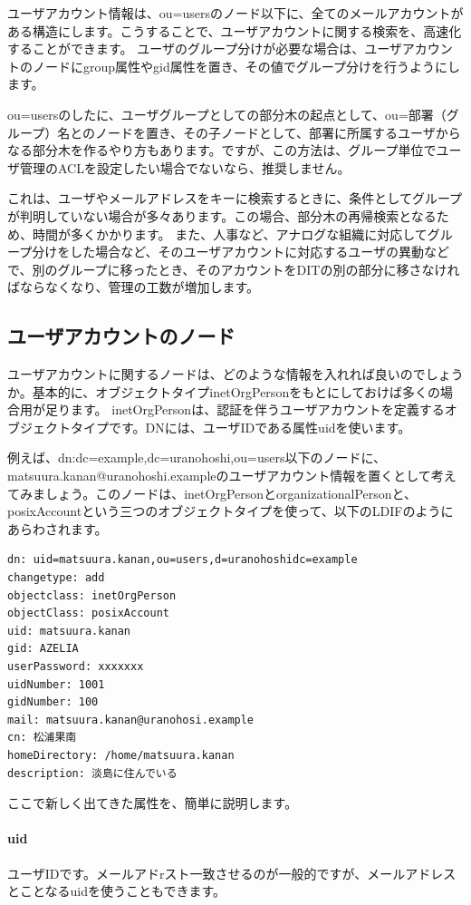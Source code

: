 ユーザアカウント情報は、ou=usersのノード以下に、全てのメールアカウントがある構造にします。こうすることで、ユーザアカウントに関する検索を、高速化することができます。
ユーザのグループ分けが必要な場合は、ユーザアカウントのノードにgroup属性やgid属性を置き、その値でグループ分けを行うようにします。

ou=usersのしたに、ユーザグループとしての部分木の起点として、ou=部署（グループ）名とのノードを置き、その子ノードとして、部署に所属するユーザからなる部分木を作るやり方もあります。ですが、この方法は、グループ単位でユーザ管理のACLを設定したい場合でないなら、推奨しません。

これは、ユーザやメールアドレスをキーに検索するときに、条件としてグループが判明していない場合が多々あります。この場合、部分木の再帰検索となるため、時間が多くかかります。
また、人事など、アナログな組織に対応してグループ分けをした場合など、そのユーザアカウントに対応するユーザの異動などで、別のグループに移ったとき、そのアカウントをDITの別の部分に移さなければならなくなり、管理の工数が増加します。

\subsection{ユーザアカウントのノード}

ユーザアカウントに関するノードは、どのような情報を入れれば良いのでしょうか。基本的に、オブジェクトタイプinetOrgPersonをもとにしておけば多くの場合用が足ります。
inetOrgPersonは、認証を伴うユーザアカウントを定義するオブジェクトタイプです。DNには、ユーザIDである属性uidを使います。

例えば、dn:dc=example,dc=uranohoshi,ou=users以下のノードに、matsuura.kanan@uranohoshi.exampleのユーザアカウント情報を置くとして考えてみましょう。このノードは、inetOrgPersonとorganizationalPersonと、posixAccountという三つのオブジェクトタイプを使って、以下のLDIFのようにあらわされます。

\begin{verbatim}
dn: uid=matsuura.kanan,ou=users,d=uranohoshidc=example
changetype: add
objectclass: inetOrgPerson
objectClass: posixAccount
uid: matsuura.kanan
gid: AZELIA
userPassword: xxxxxxx
uidNumber: 1001
gidNumber: 100
mail: matsuura.kanan@uranohosi.example
cn: 松浦果南
homeDirectory: /home/matsuura.kanan
description: 淡島に住んでいる
\end{verbatim}

ここで新しく出てきた属性を、簡単に説明します。

\paragraph{uid}
ユーザIDです。メールアドrスト一致させるのが一般的ですが、メールアドレスとことなるuidを使うこともできます。

